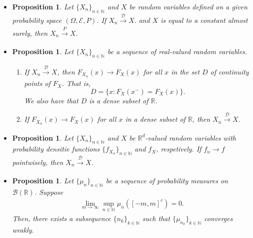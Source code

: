 \documentclass[10pt]{article}
\newtheorem{proposition}[lemma]{Proposition}
\numberwithin{lemma}{section}
\newcommand{\mcal}[1]{\mathcal{#1}}
\newcommand{\Real}{\mathbb{R}}
\newcommand{\Nat}{\mathbb{N}}
\begin{document}
\begin{itemize}
  \begin{proposition}
    Let $\{ X_n \}_{n \in \Nat}$ and $X$ be random variables defined on a given probability space $(\Omega,\mcal{E},P)$. Then, $$X_n \xrightarrow[]{P} X \implies X_n \xrightarrow[]{\mcal{D}} X.$$
  \end{proposition}

  \item \begin{proposition}
    Let $\{ X_n \}_{n \in \Nat}$ and $X$ be random variables defined on a given probability space $(\Omega,\mcal{E},P)$. If $X_n \xrightarrow[]{\mcal{D}} X.$ and $X$ is equal to a constant almost surely, then $X_n \xrightarrow[]{P} X$.
  \end{proposition}

  \item \begin{proposition}
    Let $\{ X_n \}_{n \in \Nat}$ be a sequence of real-valued random variables.
    \begin{enumerate}
      \item If $X_n \xrightarrow[]{\mcal{D}} X$, then $F_{X_n}(x) \rightarrow F_X(x)$ for all $x$ in the set $D$ of continuity points of $F_X$. That is, $$D = \{ x : F_X(x^-) = F_X(x) \}.$$ We also have that $D$ is a dense subset of $\Real$.
      
      \item If $F_{X_n}(x) \rightarrow F_X(x)$ for all $x$ in a dense subset of $\Real$, then $X_n \xrightarrow[]{\mcal{D}} X$.
    \end{enumerate}
  \end{proposition}

  \item \begin{proposition}
    Let $\{ X_n \}_{n \in \Nat}$ and $X$ be $\Real^d$-valued random variables with probability densitie functions $\{f_{X_n} \}_{n \in \Nat}$ and $f_X$, respetively. If $f_n \rightarrow f$ pointwisely, then $X_n \xrightarrow[]{\mcal{D}} X$.
  \end{proposition}

  \item \begin{proposition}
    Let $\{ \mu_n \}_{n \in \Nat}$ be a sequence of probability measures on $\mcal{B}(\Real)$. Suppose
    \begin{align*}
      \lim_{m \rightarrow \infty} \sup_{n \in \Nat} \mu_n([-m,m]^c) = 0.
    \end{align*}
    Then, there exists a subsequence $\{ n_k \}_{k \in \Nat}$ such that $\{ \mu_{n_k} \}_{k \in \Nat}$ converges weakly.
  \end{proposition}


\end{itemize}
\end{document}

